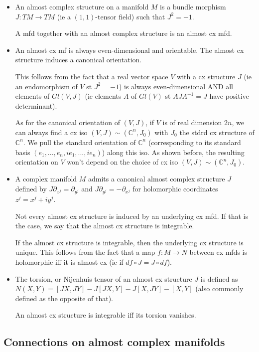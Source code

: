 \documentclass{report}
\theoremstyle{definition}
\begin{document}
\begin{itemize}
    \item An almost complex structure on a manifold $M$ is a bundle morphism $J:TM\to TM$ (ie a $(1,1)$-tensor field) such that $J^2=-1$.

    A mfd together with an almost complex structure is an almost cx mfd.
    \item An almost cx mf is always even-dimensional and orientable. The almost cx structure induces a canonical orientation.

    This follows from the fact that a real vector space $V$ with a cx structure $J$ (ie an endomorphism of $V$ st $J^2=-1$) is always even-dimensional AND all elements of $Gl(V,J)$ (ie elements $A$ of $Gl(V)$ st $AJA^{-1}=J$ have positive determinant).

    As for the canonical orientation of $(V,J)$, if $V$ is of real dimension $2n$, we can always find a cx iso $(V,J)\sim(\mathbb{C}^n,J_0)$ with $J_0$ the stdrd cx structure of $\mathbb{C}^n$. We pull the standard orientation of $\mathbb{C}^n$ (corresponding to its standard basis $(e_1,...,e_n,ie_1,...,ie_n)$) along this iso. As shown before, the resulting orientation on $V$ won't depend on the choice of cx iso $(V,J)\sim(\mathbb{C}^n,J_0)$.
    \item A complex manifold $M$ admits a canonical almost complex structure $J$ defined by $J\partial_{x^j}=\partial_{y^j}$ and $J\partial_{y^j}=-\partial_{x^j}$ for holomorphic coordinates $z^j=x^j+iy^j$.

    Not every almost cx structure is induced by an underlying cx mfd. If that is the case, we say that the almost cx structure is integrable.

    If the almost cx structure is integrable, then the underlying cx structure is unique. This follows from the fact that a map $f:M\to N$ between cx mfds is holomorphic iff it is almost cx (ie if $df\circ J=J\circ df$).
    \item The torsion, or Nijenhuis tensor of an almost cx structure $J$ is defined as $N(X,Y)=[JX,JY]-J[JX,Y]-J[X,JY]-[X,Y]$ (also commonly defined as the opposite of that).

    An almost cx structure is integrable iff its torsion vanishes.
\end{itemize}

\subsection{Connections on almost complex manifolds}
\end{document}
